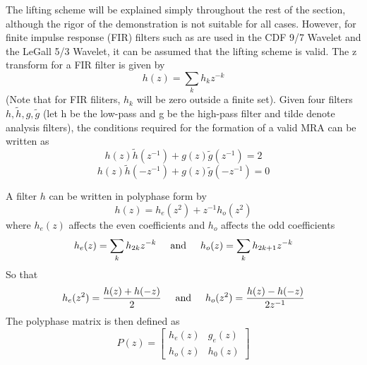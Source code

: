 \documentclass{article}
\begin{document}
The lifting scheme will be explained simply throughout the rest of the section, although the rigor of the demonstration is not suitable for all cases. However, for finite impulse response (FIR) filters such as are used in the CDF 9/7 Wavelet and the LeGall 5/3 Wavelet, it can be assumed that the lifting scheme is valid. The z transform for a FIR filter is given by
\[h(z)=\sum_{k}h_kz^{-k}\]
(Note that for FIR filiters, \(h_k\) will be zero outside a finite set). Given four filters \(h,\tilde{h},g,\tilde{g}\) (let h be the low-pass and g be the high-pass filter and tilde denote analysis filters), the conditions required for the formation of a valid MRA can be written as
\[h(z)\tilde{h}(z^{-1})+g(z)\tilde{g}(z^{-1})=2\]
\[h(z)\tilde{h}(-z^{-1})+g(z)\tilde{g}(-z^{-1})=0\]

A filter \(h\) can be written in polyphase form by
\[h(z)=h_{e}(z^{2})+z^{-1}h_{o}(z^{2})\]
where \(h_e(z)\) affects the even coefficients and \(h_o\) affects the odd coefficients
\[h_{e}(z)=\sum_{k}h_{2k}z^{-k} \text{\hspace{.5cm}and\hspace{.5cm}} h_{o}(z)=\sum_{k}h_{2k+1}z^{-k}\]
So that
\[h_{e}(z^{2})=\frac{h(z)+h(-z)}{2} \text{\hspace{.5cm}and\hspace{.5cm}} h_{o}(z^{2})=\frac{h(z)-h(-z)}{2z^{-1}}\]
The polyphase matrix is then defined as
\[P(z)=\begin{bmatrix}
    h_{e}(z) & g_{e}(z) \\
    h_{o}(z) & h_{0}(z)
\end{bmatrix}\]
\end{document}
